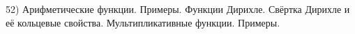 52) Арифметические функции. Примеры. Функции Дирихле. Свёртка Дирихле и её кольцевые свойства. Мультипликативные функции. Примеры.
